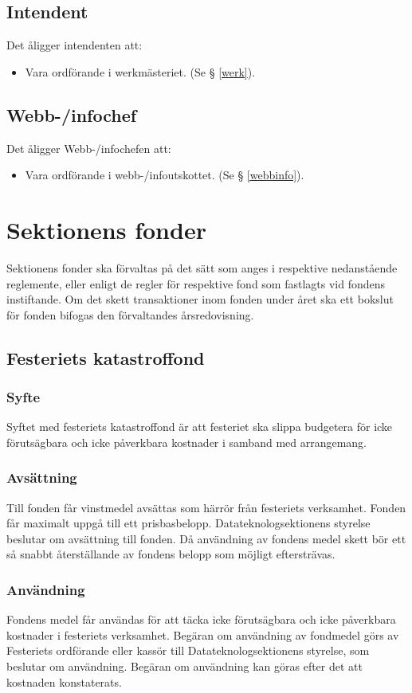 \documentclass{datateknologsektionen-document}
\begin{document}
\subsection{Intendent}
\label{intendent}
Det åligger intendenten att:
\begin{itemize}
  \item Vara ordförande i werkmästeriet. (Se § \ref{werk}).
\end{itemize}


\subsection{Webb-/infochef}
Det åligger Webb-/infochefen att:
\begin{itemize}
  \item Vara ordförande i webb-/infoutskottet. (Se § \ref{webbinfo}).
\end{itemize}


\section{Sektionens fonder}
Sektionens fonder ska förvaltas på det sätt som anges i respektive nedanstående reglemente, eller
enligt de regler för respektive fond som fastlagts vid fondens instiftande. Om det skett
transaktioner inom fonden under året ska ett bokslut för fonden bifogas den förvaltandes
årsredovisning.
\subsection{Festeriets katastroffond}
\subsubsection{Syfte}
Syftet med festeriets katastroffond är att festeriet ska slippa budgetera för icke förutsägbara och
icke påverkbara kostnader i samband med arrangemang.
\subsubsection{Avsättning}
Till fonden får vinstmedel avsättas som härrör från festeriets verksamhet. Fonden får maximalt
uppgå till ett prisbasbelopp. Datateknologsektionens styrelse beslutar om avsättning till fonden.
Då användning av fondens medel skett bör ett så snabbt återställande av fondens belopp som
möjligt eftersträvas.
\subsubsection{Användning}
Fondens medel får användas för att täcka icke förutsägbara och icke påverkbara kostnader i
festeriets verksamhet. Begäran om användning av fondmedel görs av Festeriets ordförande eller
kassör till Datateknologsektionens styrelse, som beslutar om användning. Begäran om
användning kan göras efter det att kostnaden konstaterats.
\end{document}
